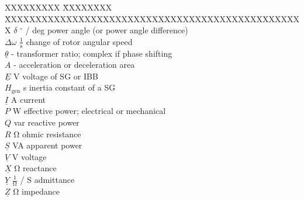 \begin{tabbing}
    XXXXXXXXX \= XXXXXXXX \= XXXXXXXXXXXXXXXXXXXXXXXXXXXXXXXXXXXXXXXXXXXXXXXXX \kill
    $\delta$            \> $^\circ$ / deg                   \> power angle (or power angle difference) \\
    $\Delta\omega$      \> $\mathrm{\frac{1}{s}}$           \> change of rotor angular speed \\
    $\underline{\theta}$\> -                                \> transformer ratio; complex if phase shifting \\
    $A$                 \> -                                \> acceleration or deceleration area \\
    $\underline{E}$     \> V                                \> voltage of \acs{SG} or \acs{IBB} \\
    $H_\mathrm{gen}$    \> s                                \> inertia constant of a \acf{SG} \\
    $\underline{I}$     \> A                                \> current \\
    $P$                 \> W                                \> effective power; electrical or mechanical \\
    $Q$                 \> var                              \> reactive power \\
    $R$                 \> $\mathrm{\Omega}$                \> ohmic resistance \\
    $\underline{S}$     \> VA                               \> apparent power \\
    $\underline{V}$     \> V                                \> voltage \\
    $\underline{X}$     \> $\mathrm{\Omega}$                \> reactance \\
    $\underline{Y}$     \> $\mathrm{\frac{1}{\Omega}}$ / S  \> admittance \\
    $\underline{Z}$     \> $\mathrm{\Omega}$                \> impedance \\
\end{tabbing}

